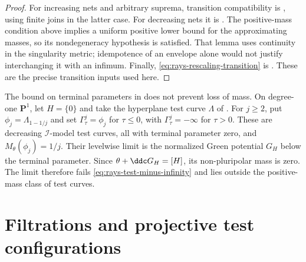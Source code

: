 \begin{proof}
For increasing nets and arbitrary suprema, transition compatibility is
\cite[Lemmas~9.4.6--9.4.7]{XiaBook}, using finite joins in the latter case.
For decreasing nets it is \cite[Lemma~9.4.9]{XiaBook}.
The positive-mass condition above implies a uniform positive lower
bound for the approximating masses, so its nondegeneracy hypothesis
is satisfied. That lemma uses continuity in the singularity metric;
idempotence of an envelope alone would not justify interchanging
it with an infimum.
Finally, \eqref{eq:rays-rescaling-transition} is
\cite[Lemma~9.4.8]{XiaBook}.
These are the precise transition inputs used here.
\end{proof}

\begin{example}\label{ex:rays-decreasing-mass-collapse}
The bound on terminal parameters in
 does not prevent loss of mass.
On degree-one $\mathbf P^1$, let $H=\{0\}$ and take the
hyperplane test curve $\Lambda$ of
.
For $j\geq2$, put $\phi_j=\Lambda_{1-1/j}$ and set
$\Gamma^j_\tau=\phi_j$ for $\tau\leq0$, with
$\Gamma^j_\tau=-\infty$ for $\tau>0$.
These are decreasing $\mathcal I$-model test curves,
all with terminal parameter zero, and $M_\theta(\phi_j)=1/j$.
Their levelwise limit is the normalized Green potential
$G_H$ below the terminal parameter.
Since $\theta+\ddc G_H=[H]$, its non-pluripolar mass is zero.
The limit therefore fails \eqref{eq:rays-test-minus-infinity}
and lies outside the positive-mass class of test curves.
\end{example}

\section{Filtrations and projective test configurations}
\label{sec:rays-filtrations}

